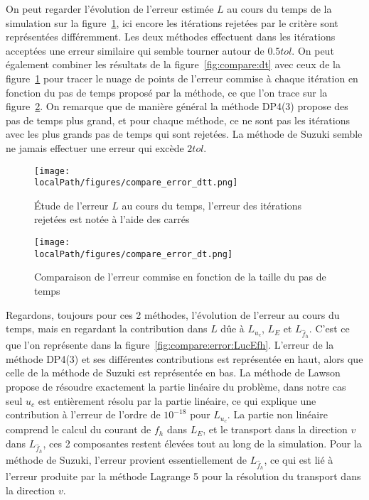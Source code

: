 On peut regarder l'évolution de l'erreur estimée $L$ au cours du temps de la simulation sur la figure~\ref{fig:compare:error_dtt}, ici encore les itérations rejetées par le critère sont représentées différemment. Les deux méthodes effectuent dans les itérations acceptées une erreur similaire qui semble tourner autour de $0.5 tol$. On peut également combiner les résultats de la figure~\ref{fig:compare:dt} avec ceux de la figure~\ref{fig:compare:error_dtt} pour tracer le nuage de points de l'erreur commise à chaque itération en fonction du pas de temps proposé par la méthode, ce que l'on trace sur la figure~\ref{fig:compare:error:dt}. On remarque que de manière général la méthode DP4(3) propose des pas de temps plus grand, et pour chaque méthode, ce ne sont pas les itérations avec les plus grands pas de temps qui sont rejetées. La méthode de Suzuki semble ne jamais effectuer une erreur qui excède $2tol$.

\begin{figure}[h]
  \centering
  \texttt{[image: \\localPath/figures/compare\_error\_dtt.png]}
  \caption{Étude de l'erreur $L$ au cours du temps, l'erreur des itérations rejetées est notée à l'aide des carrés}
  \label{fig:compare:error_dtt}
\end{figure}

\begin{figure}[h]
  \centering
  \texttt{[image: \\localPath/figures/compare\_error\_dt.png]}
  \caption{Comparaison de l'erreur commise en fonction de la taille du pas de temps}
  \label{fig:compare:error:dt}
\end{figure}

Regardons, toujours pour ces 2 méthodes, l'évolution de l'erreur au cours du temps, mais en regardant la contribution dans $L$ d\^ue à $L_{u_c}$, $L_E$ et $L_{\hat{f}_h}$. C'est ce que l'on représente dans la figure~\ref{fig:compare:error:LucEfh}. L'erreur de la méthode DP4(3) et ses différentes contributions est représentée en haut, alors que celle de la méthode de Suzuki est représentée en bas. La méthode de Lawson propose de résoudre exactement la partie linéaire du problème, dans notre cas seul $u_c$ est entièrement résolu par la partie linéaire, ce qui explique une contribution à l'erreur de l'ordre de $10^{-18}$ pour $L_{u_c}$. La partie non linéaire comprend le calcul du courant de $f_h$ dans $L_E$, et le transport dans la direction $v$ dans $L_{\hat{f}_h}$, ces 2 composantes restent élevées tout au long de la simulation. Pour la méthode de Suzuki, l'erreur provient essentiellement de $L_{\hat{f}_h}$, ce qui est  li\'e \`a l'erreur 
produite par la méthode Lagrange 5 pour la résolution du transport dans la direction $v$.

